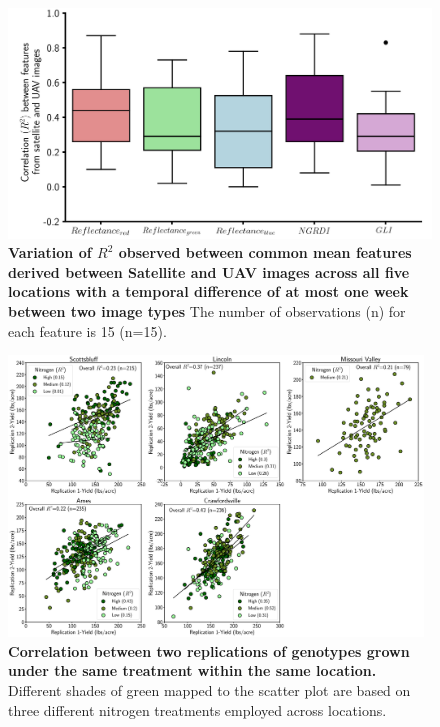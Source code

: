 \documentclass[12pt,twoside]{gsag3jnl}
\begin{document}
\begin{figure}[h!]
\centering
\includegraphics[width=1\textwidth]{SupplementalFigures/Figure1_corelation_supplemntary.png}
\caption{\textbf{Variation of $R^2$ observed between common mean features derived between Satellite and UAV images across all five locations with a temporal difference of at most one week between two image types} The number of observations (n) for each feature is 15 (n=15).
}
\label{fig:SatUAV_correlation_boxplot}
\end{figure}


\begin{figure}[h!]
\centering
\includegraphics[width=0.98\textwidth]{SupplementalFigures/SupplementaryRepCorrelation_allnitrogentoegther_nitrogen.png}
\caption{\textbf{Correlation between two replications of genotypes grown under the same treatment within the same location.} Different shades of green mapped to the scatter plot are based on three different nitrogen treatments employed across locations.}
\label{fig:yield_replication}
\end{figure}
\end{document}
